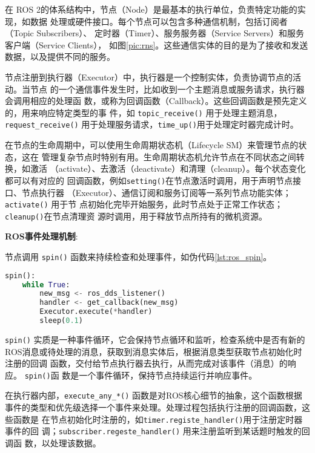 
在 ROS 2的体系结构中，节点（Node）是最基本的执行单位，负责特定功能的实现，如数据
处理或硬件接口。每个节点可以包含多种通信机制，包括订阅者（Topic Subscribers）、
定时器（Timer）、服务服务器（Service Servers）和服务客户端（Service Clients），
如图\ref{pic:rns}。这些通信实体的目的是为了接收和发送数据，以及提供不同的服务。

节点注册到执行器（Executor）中，执行器是一个控制实体，负责协调节点的活动。当节点
的一个通信事件发生时，比如收到一个主题消息或服务请求，执行器会调用相应的处理函
数，或称为回调函数（Callback）。这些回调函数是预先定义的，用来响应特定类型的事
件，如 \texttt{topic\_receive()} 用于处理主题消息， \texttt{request\_receive()}
用于处理服务请求，\texttt{time\_up()}用于处理定时器完成计时。

在节点的生命周期中，可以使用生命周期状态机（Lifecycle SM）来管理节点的状态，这在
管理复杂节点时特别有用。生命周期状态机允许节点在不同状态之间转换，如激活
（activate）、去激活（deactivate）和清理（cleanup）。每个状态变化都可以有对应的
回调函数，例如\texttt{setting()}在节点激活时调用，用于声明节点接口、节点执行器
（Executor）、通信订阅和服务订阅等一系列节点功能实体；\texttt{activate()} 用于节
点初始化完毕开始服务，此时节点处于正常工作状态； \texttt{cleanup()}在节点清理资
源时调用，用于释放节点所持有的微机资源。

\textbf{ROS事件处理机制}: 

节点调用 \texttt{spin()} 函数来持续检查和处理事件，如伪代码\ref{lst:ros_spin}。

\begin{lstlisting}[language=Python, caption=ROS2事件循环示例, label=lst:ros_spin]
spin():
    while True:
        new_msg <- ros_dds_listener()
        handler <- get_callback(new_msg)
        Executor.execute(*handler)
        sleep(0.1)
\end{lstlisting}

\texttt{spin()} 实质是一种事件循环，它会保持节点循环和监听，检查系统中是否有新的
ROS消息或待处理的消息，获取到消息实体后，根据消息类型获取节点初始化时注册的回调
函数，交付给节点执行器去执行，从而完成对该事件（消息）的响应。 \texttt{spin()}函
数是一个事件循环，保持节点持续运行并响应事件。

在执行器内部，\texttt{execute\_any\_*()} 函数是对ROS核心细节的抽象，这个函数根据
事件的类型和优先级选择一个事件来处理。处理过程包括执行注册的回调函数，这些函数是
在节点初始化时注册的，如\texttt{timer.registe\_handler()}用于注册定时器事件的回
调；\texttt{subscriber.regeste\_handler()} 用来注册监听到某话题时触发的回调函
数，以处理该数据。

